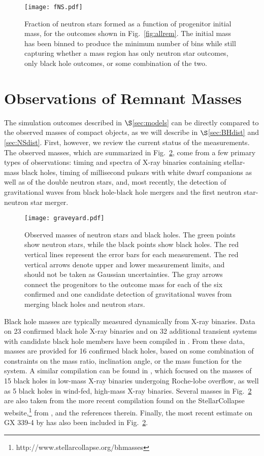 \documentclass[]{emulateapj}
\begin{document}
\begin{figure}[ht]
\centering
\texttt{[image: fNS.pdf]}
\caption{\label{fig:fNS} Fraction of neutron stars formed as a function of progenitor initial mass, for the outcomes shown in Fig.~\ref{fig:allrem}. The initial mass has been binned to produce the minimum number of bins while still capturing whether a mass region has only neutron star outcomes, only black hole outcomes, or some combination of the two.}
\end{figure}

\section{Observations of Remnant Masses}
\label{sec:obs}
The simulation outcomes described in $\S$\ref{sec:models} can be directly compared to the observed masses of compact objects, as we will describe in $\S$\ref{sec:BHdist} and \ref{sec:NSdist}. First, however, we review the current status of the measurements. The observed masses, which are summarized in Fig.~\ref{fig:graveyard}, come from a few primary types of observations:  timing and spectra of X-ray binaries containing stellar-mass black holes, timing of millisecond pulsars with white dwarf companions as well as of the double neutron stars, and, most recently, the detection of gravitational waves from black hole-black hole mergers and the first neutron star-neutron star merger.

\begin{figure}[ht]
\centering
\texttt{[image: graveyard.pdf]}
\caption{\label{fig:graveyard}  Observed masses of neutron stars and black holes. The green points show neutron stars, while the black points show black holes. The red vertical lines represent the error bars for each measurement. The red vertical arrows denote upper and lower measurement limits, and should not be taken as Gaussian uncertainties. The gray arrows connect the progenitors to the outcome mass for each of the six confirmed and one candidate detection of gravitational waves from merging black holes and neutron stars.}
\end{figure}

Black hole masses are typically measured dynamically from X-ray binaries. Data on 23 confirmed black hole X-ray binaries and on 32 additional transient systems with candidate black hole members have been compiled in \citet{Ozel2010b}. From these data, masses are provided for 16 confirmed black holes, based on some combination of constraints on the mass ratio, inclination angle, or the mass function for the system.
A similar compilation can be found in \citet{Farr2011}, which focused on the masses of 15 black holes in low-mass X-ray binaries undergoing Roche-lobe overflow, as well as 5 black holes in wind-fed, high-mass X-ray binaries. Several masses in Fig.~\ref{fig:graveyard} are also taken from the more recent compilation found on the StellarCollapse website,\footnote{http://www.stellarcollapse.org/bhmasses} from \citet{Wiktorowicz2014}, and the references therein. Finally, the most recent estimate on GX 339-4 by \citet{Heida2017} has also been included in Fig.~\ref{fig:graveyard}.
\end{document}
